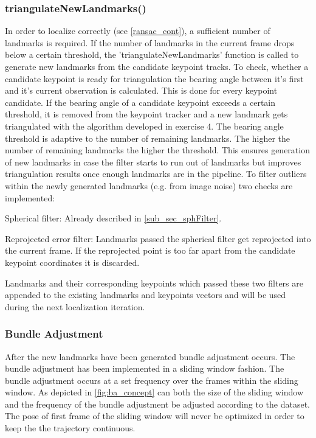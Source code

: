 \subsubsection{triangulateNewLandmarks()} \label{triang_cont}
In order to localize correctly (see \cref{ransac_cont}), a sufficient number of landmarks is required. If the number of landmarks in the current frame drops below a certain threshold, the 'triangulateNewLandmarks' function is called to generate new landmarks from the candidate keypoint tracks. To check, whether a candidate keypoint is ready for triangulation the bearing angle between it's first and it's current observation is calculated. This is done for every keypoint candidate. If the bearing angle of a candidate keypoint exceeds a certain threshold, it is removed from the keypoint tracker and a new landmark gets triangulated with the algorithm developed in exercise 4. The bearing angle threshold is adaptive to the number of remaining landmarks. The higher the number of remaining landmarks the higher the threshold. This ensures generation of new landmarks in case the filter starts to run out of landmarks but improves triangulation results once enough landmarks are in the pipeline.
To filter outliers within the newly generated landmarks (e.g. from image noise) two checks are implemented:
\begin{compactenum}
	\item Spherical filter: Already described in \cref{sub_sec_sphFilter}.
	\item Reprojected error filter: Landmarks passed the spherical filter get reprojected into the current frame. If the reprojected point is too far apart from the candidate keypoint coordinates it is discarded.
\end{compactenum}
Landmarks and their corresponding keypoints which passed these two filters are appended to the existing landmarks and keypoints vectors and will be used during the next localization iteration.

\subsubsection{Bundle Adjustment}
\label{ba_cont}
After the new landmarks have been generated bundle adjustment occurs. The bundle adjustment has been implemented in a sliding window fashion. The bundle adjustment occurs at a set frequency over the frames within the sliding window. As depicted in \cref{fig:ba_concept} can both the size of the sliding window and the frequency of the bundle adjustment be adjusted according to the dataset. The pose of first frame of the sliding window will never be optimized in order to keep the the trajectory continuous.

